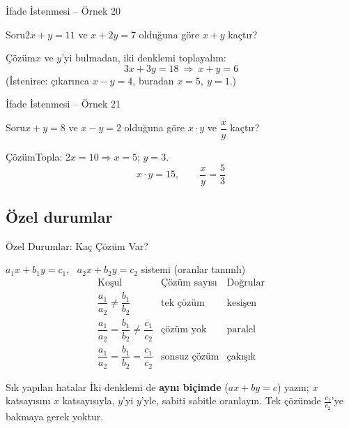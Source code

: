\documentclass[aspectratio=169,11pt,handout]{beamer}
\newcommand{\soru}[3]{%
\begin{frame}{#1}
  \begin{block}{Soru}\large #2\end{block}
  \pause
  \begin{exampleblock}{Çözüm}\large #3\end{exampleblock}
\end{frame}}
\begin{document}
\soru{İfade İstenmesi -- Örnek 20}
{\(2x+y=11\) ve \(x+2y=7\) olduğuna göre \(x+y\) kaçtır?}
{\(x\) ve \(y\)'yi bulmadan, iki denklemi toplayalım:
\[3x+3y=18\ \Rightarrow\ x+y=6\]
(İstenirse: çıkarınca \(x-y=4\), buradan \(x=5,\ y=1\).)}

\soru{İfade İstenmesi -- Örnek 21}
{\(x+y=8\) ve \(x-y=2\) olduğuna göre \(x\cdot y\) ve \(\dfrac{x}{y}\) kaçtır?}
{Topla: \(2x=10\Rightarrow x=5\); \quad \(y=3\).
\[x\cdot y=15,\qquad \frac{x}{y}=\frac{5}{3}\]}

\subsection{Özel durumlar}
\begin{frame}{Özel Durumlar: Kaç Çözüm Var?}
\begin{block}{\(a_1x+b_1y=c_1\), \ \(a_2x+b_2y=c_2\) sistemi \quad (oranlar tanımlı)}
\[\renewcommand{\arraystretch}{1.2}
\begin{array}{lll}
\text{Koşul} & \text{Çözüm sayısı} & \text{Doğrular}\\\hline
\dfrac{a_1}{a_2}\neq\dfrac{b_1}{b_2} & \text{tek çözüm} & \text{kesişen}\\[10pt]
\dfrac{a_1}{a_2}=\dfrac{b_1}{b_2}\neq\dfrac{c_1}{c_2} & \text{çözüm yok} & \text{paralel}\\[10pt]
\dfrac{a_1}{a_2}=\dfrac{b_1}{b_2}=\dfrac{c_1}{c_2} & \text{sonsuz çözüm} & \text{çakışık}
\end{array}\]
\end{block}
\begin{alertblock}{Sık yapılan hatalar}
İki denklemi de \textbf{aynı biçimde} (\(ax+by=c\)) yazın; \(x\) katsayısını \(x\) katsayısıyla, \(y\)'yi \(y\)'yle, sabiti sabitle oranlayın. Tek çözümde \(\frac{c_1}{c_2}\)'ye bakmaya gerek yoktur.
\end{alertblock}
\end{frame}
\end{document}
